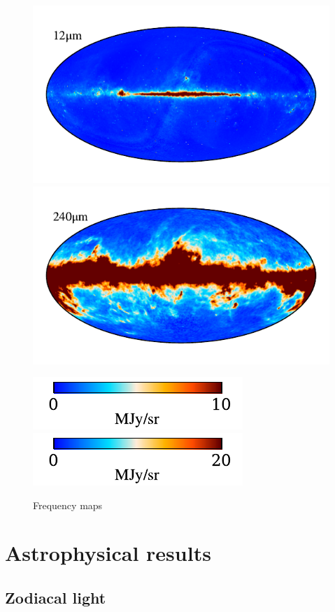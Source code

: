 \documentclass{aa}
\begin{document}
\begin{figure}
  
    \includegraphics[width=0.8\columnwidth]{figs/freq_maps/freq_05_c0001_000019.pdf}\includegraphics[width=0.8\columnwidth]{figs/freq_maps/freq_10_c0001_000019.pdf}
    \vspace*{-0.5cm}

    \includegraphics[width=0.4\columnwidth]{figs/freq_maps/freq_cbar_05_c0001_000019.pdf}\hspace{3.6cm}\includegraphics[width=0.4\columnwidth]{figs/freq_maps/freq_cbar_10_c0001_000019.pdf}

  
  
    \caption{Frequency maps}
    \label{fig:freq_maps}
\end{figure}

\section{Astrophysical results}
\subsection{Zodiacal light}
\end{document}
